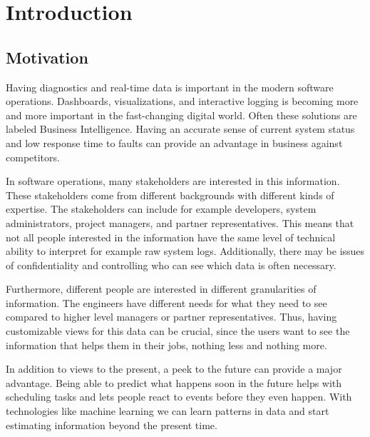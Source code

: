 
\section{Introduction}
\thispagestyle{empty}

\subsection{Motivation}
Having diagnostics and real-time data is important in the modern software operations.
Dashboards, visualizations, and interactive logging is becoming more and more important
in the fast-changing digital world. Often these solutions are labeled Business Intelligence.
Having an accurate sense of current system status and low response time to faults can provide an advantage
in business against competitors.


In software operations, many stakeholders are interested in this information. 
These stakeholders come from different backgrounds with different kinds of expertise.
The stakeholders can include for example developers, system administrators, project managers, and partner representatives.
This means that not all people interested in the information have the same level of technical ability to 
interpret for example raw system logs. Additionally, there may be issues of confidentiality and
controlling who can see which data is often necessary.

Furthermore, different people are interested in different granularities of information.
The engineers have different needs for what they need to see compared to higher level managers
or partner representatives.
Thus, having customizable views for this data can be crucial,
since the users want to see the information that helps them in their jobs, nothing less and nothing more.

In addition to views to the present, a peek to the future can provide a major advantage.
Being able to predict what happens soon in the future helps with scheduling tasks and lets people react 
to events before they even happen. With technologies like machine learning we can learn patterns in data and 
start estimating information beyond the present time.

